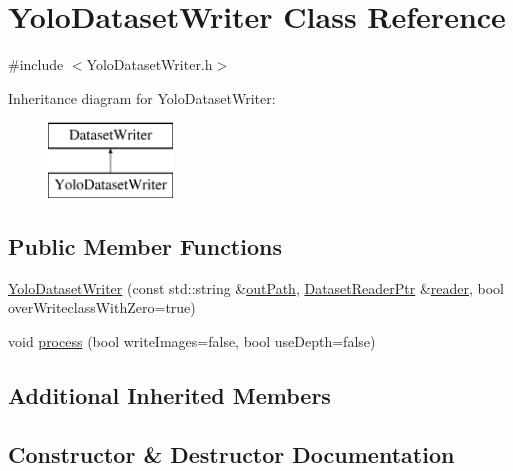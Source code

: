 \hypertarget{class_yolo_dataset_writer}{}\section{Yolo\+Dataset\+Writer Class Reference}
\label{class_yolo_dataset_writer}


{\ttfamily \#include $<$Yolo\+Dataset\+Writer.\+h$>$}

Inheritance diagram for Yolo\+Dataset\+Writer\+:\begin{figure}[H]
\begin{center}
\leavevmode
\includegraphics[height=2.000000cm]{class_yolo_dataset_writer}
\end{center}
\end{figure}
\subsection*{Public Member Functions}
\begin{DoxyCompactItemize}
\item 
\hyperlink{class_yolo_dataset_writer_a759e0ab21548b9219970fca5e02001f9}{Yolo\+Dataset\+Writer} (const std\+::string \&\hyperlink{class_dataset_writer_ac19eabc3e69f6e9bc4c5185803eed626}{out\+Path}, \hyperlink{_dataset_reader_8h_a30d89cba514a220d64d04535c0465f1c}{Dataset\+Reader\+Ptr} \&\hyperlink{class_dataset_writer_a2edef70c0de507a2e056eb3984705811}{reader}, bool over\+Writeclass\+With\+Zero=true)
\item 
void \hyperlink{class_yolo_dataset_writer_a29ecb0d94701fc78b0b800d9665ca70d}{process} (bool write\+Images=false, bool use\+Depth=false)
\end{DoxyCompactItemize}
\subsection*{Additional Inherited Members}


\subsection{Constructor \& Destructor Documentation}
\mbox{\label{class_yolo_dataset_writer_a759e0ab21548b9219970fca5e02001f9}} 

